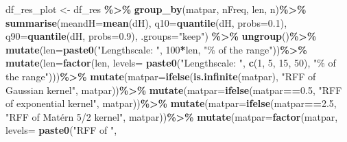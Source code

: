\documentclass[
]{article}
\newenvironment{Shaded}{\begin{snugshade}}{\end{snugshade}}
\newcommand{\AttributeTok}[1]{\textcolor[rgb]{0.13,0.29,0.53}{#1}}
\newcommand{\DecValTok}[1]{\textcolor[rgb]{0.00,0.00,0.81}{#1}}
\newcommand{\FloatTok}[1]{\textcolor[rgb]{0.00,0.00,0.81}{#1}}
\newcommand{\FunctionTok}[1]{\textcolor[rgb]{0.13,0.29,0.53}{\textbf{#1}}}
\newcommand{\NormalTok}[1]{#1}
\newcommand{\OtherTok}[1]{\textcolor[rgb]{0.56,0.35,0.01}{#1}}
\newcommand{\SpecialCharTok}[1]{\textcolor[rgb]{0.81,0.36,0.00}{\textbf{#1}}}
\newcommand{\StringTok}[1]{\textcolor[rgb]{0.31,0.60,0.02}{#1}}
\begin{document}
\begin{Shaded}
\begin{Highlighting}[]
\NormalTok{df\_res\_plot }\OtherTok{\textless{}{-}}\NormalTok{ df\_res }\SpecialCharTok{\%\textgreater{}\%}
  \FunctionTok{group\_by}\NormalTok{(matpar, nFreq, len, n)}\SpecialCharTok{\%\textgreater{}\%}
  \FunctionTok{summarise}\NormalTok{(}\AttributeTok{meandH=}\FunctionTok{mean}\NormalTok{(dH),}
            \AttributeTok{q10=}\FunctionTok{quantile}\NormalTok{(dH, }\AttributeTok{probs=}\FloatTok{0.1}\NormalTok{),}
            \AttributeTok{q90=}\FunctionTok{quantile}\NormalTok{(dH, }\AttributeTok{probs=}\FloatTok{0.9}\NormalTok{), }\AttributeTok{.groups=}\StringTok{"keep"}\NormalTok{) }\SpecialCharTok{\%\textgreater{}\%}
  \FunctionTok{ungroup}\NormalTok{()}\SpecialCharTok{\%\textgreater{}\%}
  \FunctionTok{mutate}\NormalTok{(}\AttributeTok{len=}\FunctionTok{paste0}\NormalTok{(}\StringTok{"Lengthscale: "}\NormalTok{, }\DecValTok{100}\SpecialCharTok{*}\NormalTok{len,}
                    \StringTok{"\% of the range"}\NormalTok{))}\SpecialCharTok{\%\textgreater{}\%}
  \FunctionTok{mutate}\NormalTok{(}\AttributeTok{len=}\FunctionTok{factor}\NormalTok{(len, }\AttributeTok{levels=} \FunctionTok{paste0}\NormalTok{(}\StringTok{"Lengthscale: "}\NormalTok{, }
                                        \FunctionTok{c}\NormalTok{(}\DecValTok{1}\NormalTok{, }\DecValTok{5}\NormalTok{, }\DecValTok{15}\NormalTok{, }\DecValTok{50}\NormalTok{),}
                                        \StringTok{"\% of the range"}\NormalTok{)))}\SpecialCharTok{\%\textgreater{}\%}
  \FunctionTok{mutate}\NormalTok{(}\AttributeTok{matpar=}\FunctionTok{ifelse}\NormalTok{(}\FunctionTok{is.infinite}\NormalTok{(matpar), }
                       \StringTok{"RFF of Gaussian kernel"}\NormalTok{, }
\NormalTok{                       matpar))}\SpecialCharTok{\%\textgreater{}\%}
  \FunctionTok{mutate}\NormalTok{(}\AttributeTok{matpar=}\FunctionTok{ifelse}\NormalTok{(matpar}\SpecialCharTok{==}\FloatTok{0.5}\NormalTok{, }
                       \StringTok{"RFF of exponential kernel"}\NormalTok{, }
\NormalTok{                       matpar))}\SpecialCharTok{\%\textgreater{}\%}
  \FunctionTok{mutate}\NormalTok{(}\AttributeTok{matpar=}\FunctionTok{ifelse}\NormalTok{(matpar}\SpecialCharTok{==}\FloatTok{2.5}\NormalTok{, }
                       \StringTok{"RFF of Matérn 5/2 kernel"}\NormalTok{, }
\NormalTok{                       matpar))}\SpecialCharTok{\%\textgreater{}\%}
  \FunctionTok{mutate}\NormalTok{(}\AttributeTok{matpar=}\FunctionTok{factor}\NormalTok{(matpar, }\AttributeTok{levels=} \FunctionTok{paste0}\NormalTok{(}\StringTok{"RFF of "}\NormalTok{,}

\end{Highlighting}
\end{Shaded}
\end{document}
